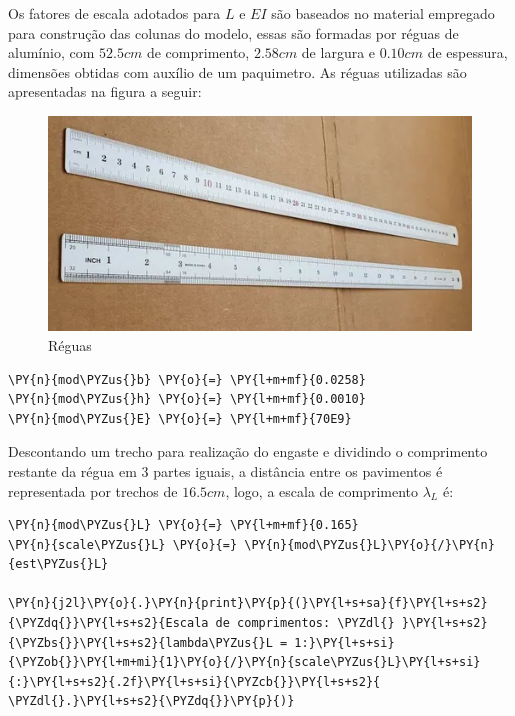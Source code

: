     Os fatores de escala adotados para \(L\) e \(EI\) são baseados no
material empregado para construção das colunas do modelo, essas são
formadas por réguas de alumínio, com \(52.5 cm\) de comprimento,
\(2.58 cm\) de largura e \(0.10 cm\) de espessura, dimensões obtidas com
auxílio de um paquimetro. As réguas utilizadas são apresentadas na
figura a seguir:

\begin{figure}
\centering
\includegraphics[scale=0.8]{../images/reguas.png}
\caption{Réguas}
\end{figure}

    \begin{tcolorbox}[breakable, size=fbox, boxrule=1pt, pad at break*=1mm,colback=cellbackground, colframe=cellborder]
\begin{Verbatim}[commandchars=\\\{\}]
\PY{n}{mod\PYZus{}b} \PY{o}{=} \PY{l+m+mf}{0.0258}
\PY{n}{mod\PYZus{}h} \PY{o}{=} \PY{l+m+mf}{0.0010}
\PY{n}{mod\PYZus{}E} \PY{o}{=} \PY{l+m+mf}{70E9}
\end{Verbatim}
\end{tcolorbox}

    Descontando um trecho para realização do engaste e dividindo o
comprimento restante da régua em 3 partes iguais, a distância entre os
pavimentos é representada por trechos de \(16.5 cm\), logo, a escala de
comprimento \(\lambda_L\) é:

    \begin{tcolorbox}[breakable, size=fbox, boxrule=1pt, pad at break*=1mm,colback=cellbackground, colframe=cellborder]
\begin{Verbatim}[commandchars=\\\{\}]
\PY{n}{mod\PYZus{}L} \PY{o}{=} \PY{l+m+mf}{0.165}
\PY{n}{scale\PYZus{}L} \PY{o}{=} \PY{n}{mod\PYZus{}L}\PY{o}{/}\PY{n}{est\PYZus{}L}

\PY{n}{j2l}\PY{o}{.}\PY{n}{print}\PY{p}{(}\PY{l+s+sa}{f}\PY{l+s+s2}{\PYZdq{}}\PY{l+s+s2}{Escala de comprimentos: \PYZdl{} }\PY{l+s+s2}{\PYZbs{}}\PY{l+s+s2}{lambda\PYZus{}L = 1:}\PY{l+s+si}{\PYZob{}}\PY{l+m+mi}{1}\PY{o}{/}\PY{n}{scale\PYZus{}L}\PY{l+s+si}{:}\PY{l+s+s2}{.2f}\PY{l+s+si}{\PYZcb{}}\PY{l+s+s2}{ \PYZdl{}.}\PY{l+s+s2}{\PYZdq{}}\PY{p}{)}
\end{Verbatim}
\end{tcolorbox}

